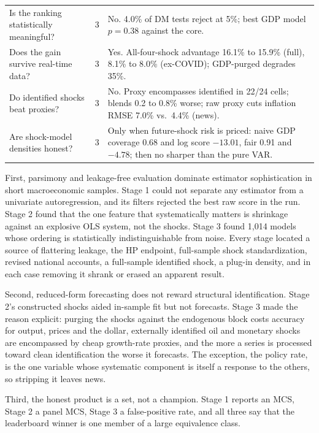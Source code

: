 \documentclass[conference]{IEEEtran}
\begin{document}
\begin{table}[t]
\begin{tabular}{@{}p{}p{}p{}@{}}
Is the ranking statistically meaningful? & 3 & No. 4.0\% of DM tests reject at 5\%; best GDP model $p=0.38$ against the core. \\
Does the gain survive real-time data? & 3 & Yes. All-four-shock advantage 16.1\% to 15.9\% (full), 8.1\% to 8.0\% (ex-COVID); GDP-purged degrades 35\%. \\
Do identified shocks beat proxies? & 3 & No. Proxy encompasses identified in 22/24 cells; blends 0.2 to 0.8\% worse; raw proxy cuts inflation RMSE 7.0\% vs.\ 4.4\% (news). \\
Are shock-model densities honest? & 3 & Only when future-shock risk is priced: naive GDP coverage 0.68 and log score $-13.01$, fair 0.91 and $-4.78$; then no sharper than the pure VAR. \\
\bottomrule
\end{tabular}
\end{table}

First, parsimony and leakage-free evaluation dominate estimator sophistication in short macroeconomic samples. Stage 1 could not separate any estimator from a univariate autoregression, and its filters rejected the best raw score in the run. Stage 2 found that the one feature that systematically matters is shrinkage against an explosive OLS system, not the shocks. Stage 3 found 1,014 models whose ordering is statistically indistinguishable from noise. Every stage located a source of flattering leakage, the HP endpoint, full-sample shock standardization, revised national accounts, a full-sample identified shock, a plug-in density, and in each case removing it shrank or erased an apparent result.

Second, reduced-form forecasting does not reward structural identification. Stage 2's constructed shocks aided in-sample fit but not forecasts. Stage 3 made the reason explicit: purging the shocks against the endogenous block costs accuracy for output, prices and the dollar, externally identified oil and monetary shocks are encompassed by cheap growth-rate proxies, and the more a series is processed toward clean identification the worse it forecasts. The exception, the policy rate, is the one variable whose systematic component is itself a response to the others, so stripping it leaves news.

Third, the honest product is a set, not a champion. Stage 1 reports an MCS, Stage 2 a panel MCS, Stage 3 a false-positive rate, and all three say that the leaderboard winner is one member of a large equivalence class.
\end{document}
